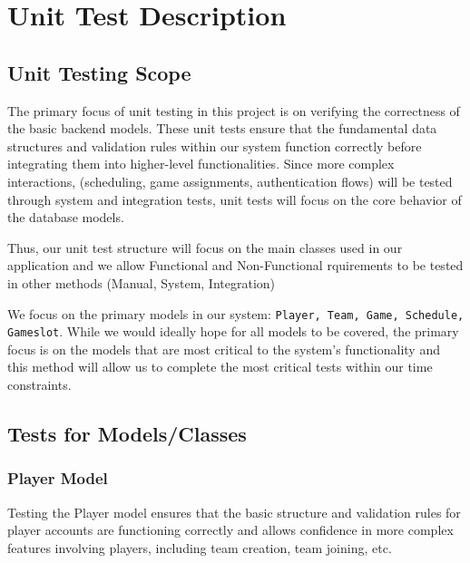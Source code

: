\documentclass[12pt, titlepage]{article}
\begin{document}
\section{Unit Test Description}

\subsection{Unit Testing Scope}

The primary focus of unit testing in this project is on verifying the correctness of the basic backend models. These unit tests ensure that the fundamental data structures and validation rules within our system function correctly before integrating them into higher-level functionalities. Since more complex interactions, (scheduling, game assignments, authentication flows) will be tested through system and integration tests, unit tests will focus on the core behavior of the database models.

Thus, our unit test structure will focus on the main classes used in our application and we allow Functional and Non-Functional rquirements to be tested in other methods (Manual, System, Integration)

We focus on the primary models in our system: \texttt{Player, Team, Game, Schedule, Gameslot}. While we would ideally hope for all models to be covered, the primary focus is on the models that are most critical to the system's functionality and this method will allow us to complete the most critical tests within our time constraints. 

\subsection{Tests for Models/Classes}

\subsubsection{Player Model}

Testing the Player model ensures that the basic structure and validation rules for player accounts are functioning correctly and allows confidence in more complex features involving players, including team creation, team joining, etc.
\end{document}
